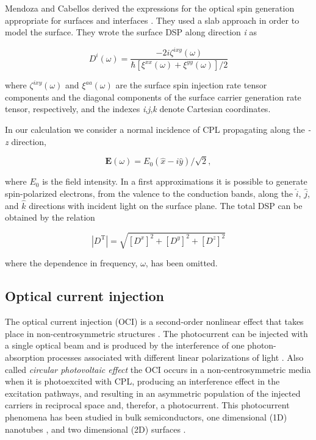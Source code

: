 \documentclass[aps,pra,11pt,tightenlines,showpacs,superscriptaddress,groupedaddress]{revtex4-1}
\begin{document}
Mendoza and Cabellos derived the expressions for the optical spin generation
appropriate for surfaces and interfaces \cite{mendoza2012optical}. They used a
slab approach in order to model the surface. They wrote the surface DSP along
direction \emph{i} as

\begin{equation}
    D^{i}(\omega) = \frac{-2i \zeta^{ixy} (\omega)}{\hbar \left[
    \xi^{xx}(\omega) + \xi^{yy}(\omega) \right] /2 } \label{eq:D^i}
\end{equation}

\noindent where $\zeta^{ixy} (\omega)$ and $\xi^{aa}(\omega)$ are the surface
spin injection rate tensor components and the diagonal components of the
surface carrier generation rate tensor, respectively, and the indexes
\emph{i},\emph{j},\emph{k} denote Cartesian coordinates.

In our calculation we consider a normal incidence of CPL propagating along the
\emph{-z} direction,

\begin{equation*}
    \mathbf{E} (\omega) = E_{0}(\hat{x} -i \hat{y})/\sqrt{2}, 
\end{equation*}


\noindent where $E_{0}$ is the field intensity. In a first approximations it is 
possible to generate spin-polarized electrons, from the valence to the
conduction bands, along the $\hat{i}$, $\hat{j}$, and $\hat{k}$ directions with
incident light on the surface plane. The total DSP can be obtained by the
relation

\begin{equation*}
    |{D^{\text{T}}}| = \sqrt{ \left[ D^{x} \right]^{2} + \left[ D^{y}
    \right]^{2} + \left[ D^{z} \right]^{2} }
\end{equation*}

\noindent where the dependence in frequency, $\omega$, has been omitted.

    \subsection{Optical current injection}

The optical current injection (OCI) is a second-order nonlinear effect that
takes place in non-centrosymmetric structures \cite{nastos2006optical,
cabellos2011optical,bhat2005excitonic,fraser1999quantum}. The photocurrent can
be injected with a single optical beam and is produced by the interference of
one photon-absorption processes associated with different linear polarizations
of light \cite{sipe2000second}. Also called  \emph{circular photovoltaic
effect} the OCI occurs in a non-centrosymmetric media when it is photoexcited
with CPL, producing an interference effect in the excitation pathways, and
resulting in an asymmetric population of the injected carriers in reciprocal
space and, therefor, a photocurrent. This photocurrent phenomena has been
studied in bulk semiconductors, one dimensional (1D) nanotubes
\cite{mele2000coherent,kral2000photogalvanic}, and two dimensional (2D)
surfaces \cite{mele2000coherent}.
\end{document}
